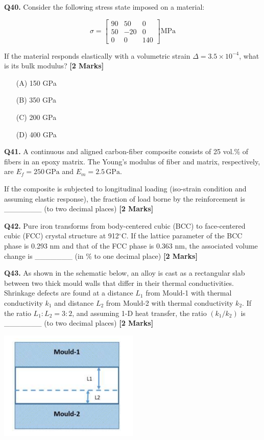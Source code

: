 \documentclass[11pt]{article}
\newcommand{\questionb}[2]{
    \noindent\textbf{Q#2.} #1 \hfill \textbf{[2 Marks]}
}
\begin{document}
\questionb{Consider the following stress state imposed on a material:

\[
\sigma = \begin{bmatrix}
90 & 50 & 0 \\
50 & -20 & 0 \\
0 & 0 & 140
\end{bmatrix} \text{MPa}
\]

If the material responds elastically with a volumetric strain \(\Delta = 3.5 \times 10^{-4}\), what is its bulk modulus?}{40}
\begin{enumerate}
    \item[(A)] 150 GPa  
    \item[(B)] 350 GPa  
    \item[(C)] 200 GPa  
    \item[(D)] 400 GPa  
\end{enumerate}
\vspace{0.5cm}

\questionb{A continuous and aligned carbon-fiber composite consists of 25 vol.\% of fibers in an epoxy matrix. The Young’s modulus of fiber and matrix, respectively, are \(E_f = 250\, \text{GPa}\) and \(E_m = 2.5\, \text{GPa}\).  

If the composite is subjected to longitudinal loading (iso-strain condition and assuming elastic response), the fraction of load borne by the reinforcement is \_\_\_\_\_\_\_ (to two decimal places)}{41}
\vspace{0.5cm}

\questionb{Pure iron transforms from body-centered cubic (BCC) to face-centered cubic (FCC) crystal structure at 912\(^\circ\)C. If the lattice parameter of the BCC phase is 0.293 nm and that of the FCC phase is 0.363 nm, the associated volume change is \_\_\_\_\_\_\_ (in \% to one decimal place)}{42}
\vspace{0.5cm}

\questionb{As shown in the schematic below, an alloy is cast as a rectangular slab between two thick mould walls that differ in their thermal conductivities. Shrinkage defects are found at a distance \(L_1\) from Mould-1 with thermal conductivity \(k_1\) and distance \(L_2\) from Mould-2 with thermal conductivity \(k_2\). If the ratio \(L_1 : L_2 = 3 : 2\), and assuming 1-D heat transfer, the ratio \((k_1 / k_2)\) is \_\_\_\_\_\_\_ (to two decimal places)}{43}
\begin{center}
\includegraphics[width=0.5\textwidth]{figures/43.png}
\end{center}
\vspace{0.5cm}
\end{document}
